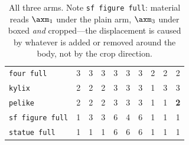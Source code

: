 \begin{table}[t]
\begin{tabular}{@{}lccccccccc@{}}
\texttt{four full}              & 3 & 3 & 3 & 3 & 3 & 3 & 2 & 2 & 2 \\
\texttt{kylix}                  & 2 & 2 & 2 & 3 & 3 & 3 & 1 & 3 & 3 \\
\texttt{pelike}                 & 2 & 2 & 2 & 3 & 3 & 3 & 1 & 1 & \textbf{2} \\
\texttt{sf figure full}         & 1 & 3 & 3 & 6 & 4 & 6 & 1 & 1 & 1 \\
\texttt{statue full}            & 1 & 1 & 1 & 6 & 6 & 6 & 1 & 1 & 1 \\
\bottomrule
\end{tabular}
\caption{All three arms. Note \texttt{sf figure full}: material reads
$\axm_1$ under the plain arm, $\axm_3$ under boxed \emph{and} cropped---the
displacement is caused by whatever is added or removed around the body, not by
the crop direction.}
\label{tab:threearm}
\end{table}
